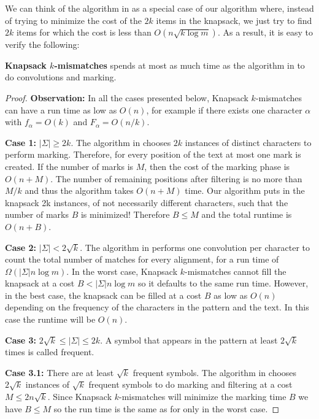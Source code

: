 We can think of the algorithm in \cite{ALP04} as a special case of our
algorithm where, instead of trying to minimize the cost of the $2k$ items in the
knapsack, we just try to find $2k$ items for which the cost is less than
$O(n\sqrt{k \log m})$. As a result, it is easy to verify the following:
\begin{theorem}\label{knapsack_less}
{\bf Knapsack $k$-mismatches} spends at most as much time as
the algorithm in \cite{ALP04} to do convolutions and marking.
\end{theorem}

\begin{proof}
{\bf Observation:} In all the cases presented below,
Knapsack $k$-mismatches can have a run time as low as $O(n)$, for example if
there exists one character $\alpha$ with $f_\alpha = O(k)$ and $F_\alpha = O(n/k)$.

{\bf Case 1:} $|\Sigma| \geq 2k$. The algorithm in \cite{ALP04} chooses $2k$
instances of distinct characters to perform marking. Therefore, for every
position of the text at most one mark is created. If the number of
marks is $M$, then the cost of the marking phase is $O(n + M)$.
The number of remaining positions after filtering is no more than $M/k$ and thus the algorithm takes
$O(n+M)$ time.
Our algorithm puts in the knapsack 2k instances, of not necessarily different
characters, such that the number of marks $B$ is minimized! Therefore $B \leq M$
and the total runtime is $O(n+B)$.

{\bf Case 2:} $|\Sigma| < 2\sqrt{k}$. The algorithm in \cite{ALP04} performs
one convolution per character to count the total number of matches for every
alignment, for a run time of $\Omega(|\Sigma|n\log m)$. In the worst case, 
Knapsack $k$-mismatches cannot fill the knapsack at a cost $B < |\Sigma|n\log
m$ so it defaults to the same run time. However, in the best case, the
knapsack can be filled at a cost $B$ as low as $O(n)$ depending on the
frequency of the characters in the pattern and the text. In this case the
runtime will be $O(n)$.

{\bf Case 3:} $2\sqrt{k} \leq |\Sigma| \leq 2k$. A symbol that appears in the
pattern at least $2\sqrt{k}$ times is called frequent.

{\bf Case 3.1:} There are at least $\sqrt{k}$ frequent symbols. The algorithm in
\cite{ALP04} chooses $2\sqrt{k}$ instances of $\sqrt{k}$ frequent symbols to do
marking and filtering at a cost $M \leq 2n\sqrt{k}$. Since Knapsack
$k$-mismatches will minimize the marking time $B$ we have
$B \leq M$ so the run time is the same as for \cite{ALP04} only in the worst
case.


\end{proof}
